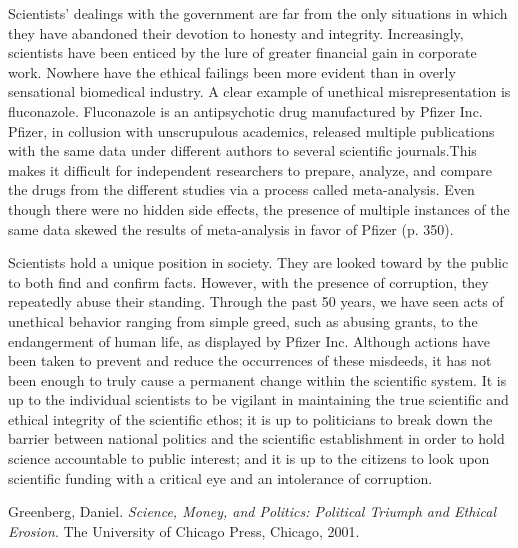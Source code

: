 \documentclass{article}[12pt]
\begin{document}
Scientists' dealings with the government are far from the only situations in
which they have abandoned their devotion to honesty and integrity.
Increasingly, scientists have been enticed by the lure of greater financial
gain in corporate work. Nowhere have the ethical failings been more evident
than in overly sensational biomedical industry. A clear example of unethical
misrepresentation is fluconazole.  Fluconazole is an antipsychotic drug
manufactured by Pfizer Inc.  Pfizer, in collusion with unscrupulous academics,
released multiple publications with the same data under different authors to
several scientific journals.This makes it difficult for independent researchers
to prepare, analyze, and compare the drugs from  the different studies via a
process called meta-analysis. Even though there were no hidden side effects, 
the presence of multiple instances of the same
data skewed the results of meta-analysis in favor of Pfizer (p. 350).

Scientists hold a unique position in society. They are looked toward by the
public to both find and confirm facts. However, with the presence of
corruption, they repeatedly abuse their standing.  Through the past 50 years,
we have seen acts of unethical behavior ranging from simple greed, such as
abusing grants, to the endangerment of human life, as displayed by Pfizer Inc.
Although actions have been taken to prevent and reduce the occurrences of these
misdeeds, it has not been enough to truly cause a permanent change within the
scientific system. It is up to the individual scientists to be vigilant in
maintaining the true scientific and ethical integrity of the scientific ethos;
it is up to politicians to break down the barrier between national politics and
the scientific establishment in order to hold science accountable to public
interest; and it is up to the citizens to look upon scientific funding with a
critical eye and an intolerance of corruption.

\newpage
\begin{thebibliography}{9}

  Greenberg, Daniel.
  \emph{Science, Money, and Politics: Political Triumph and Ethical Erosion}.
  The University of Chicago Press, Chicago,
  2001.

\end{thebibliography}
\end{document}
